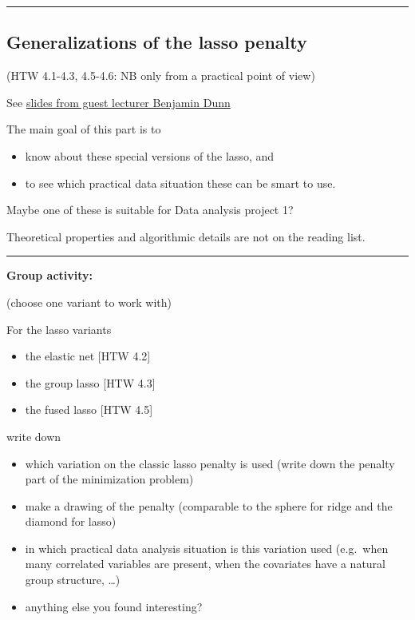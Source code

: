 \documentclass[
]{article}
\providecommand{\tightlist}{%
  \setlength{\itemsep}{0pt}\setlength{\parskip}{0pt}}
\begin{document}
\begin{center}\rule{0.5\linewidth}{0.5pt}\end{center}

\hypertarget{generalizations-of-the-lasso-penalty}{%
\subsection{Generalizations of the lasso
penalty}\label{generalizations-of-the-lasso-penalty}}

(HTW 4.1-4.3, 4.5-4.6: NB only from a practical point of view)

See
\href{https://github.com/mettelang/MA8701V2021/blob/main/Part1/LassoandfriendsBenDunn.pdf}{slides
from guest lecturer Benjamin Dunn}

The main goal of this part is to

\begin{itemize}
\tightlist
\item
  know about these special versions of the lasso, and
\item
  to see which practical data situation these can be smart to use.
\end{itemize}

Maybe one of these is suitable for Data analysis project 1?

Theoretical properties and algorithmic details are not on the reading
list.

\begin{center}\rule{0.5\linewidth}{0.5pt}\end{center}

\textbf{Group activity:}

(choose one variant to work with)

For the lasso variants

\begin{itemize}
\tightlist
\item
  the elastic net {[}HTW 4.2{]}
\item
  the group lasso {[}HTW 4.3{]}
\item
  the fused lasso {[}HTW 4.5{]} 
\end{itemize}

write down

\begin{itemize}
\tightlist
\item
  which variation on the classic lasso penalty is used (write down the
  penalty part of the minimization problem)
\item
  make a drawing of the penalty (comparable to the sphere for ridge and
  the diamond for lasso)
\item
  in which practical data analysis situation is this variation used
  (e.g.~when many correlated variables are present, when the covariates
  have a natural group structure, \ldots)
\item
  anything else you found interesting?
\end{itemize}
\end{document}
